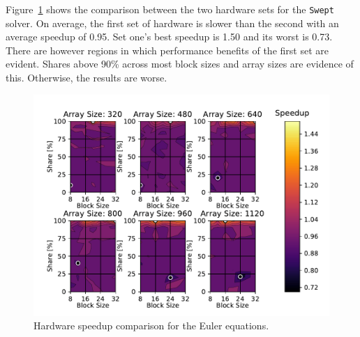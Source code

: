 \documentclass[review]{elsarticle}
\def\Swept{\texttt{Swept}}
\begin{document}
Figure~\ref{fig:eulerHardwareComp} shows the comparison between the two hardware sets for the \Swept{} solver. On average, the first set of hardware is slower than the second with an average speedup of 0.95. Set one's best speedup is 1.50 and its worst is 0.73. There are however regions in which performance benefits of the first set are evident. Shares above 90\% across most block sizes and array sizes are evidence of this. Otherwise, the results are worse. 

\begin{figure}[htb!]
    \centering
    \includegraphics[scale=0.7]{figs/hardwareSpeedUpeuler.pdf}
    \caption{Hardware speedup comparison for the Euler equations.}
    \label{fig:eulerHardwareComp}
\end{figure}
\end{document}
